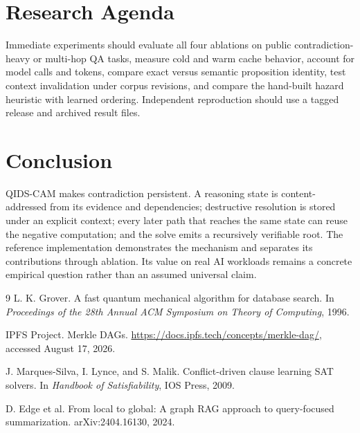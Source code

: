 \documentclass[11pt]{article}
\begin{document}
\section{Research Agenda}
Immediate experiments should evaluate all four ablations on public contradiction-heavy or multi-hop QA tasks, measure cold and warm cache behavior, account for model calls and tokens, compare exact versus semantic proposition identity, test context invalidation under corpus revisions, and compare the hand-built hazard heuristic with learned ordering. Independent reproduction should use a tagged release and archived result files.

\section{Conclusion}
QIDS-CAM makes contradiction persistent. A reasoning state is content-addressed from its evidence and dependencies; destructive resolution is stored under an explicit context; every later path that reaches the same state can reuse the negative computation; and the solve emits a recursively verifiable root. The reference implementation demonstrates the mechanism and separates its contributions through ablation. Its value on real AI workloads remains a concrete empirical question rather than an assumed universal claim.

\begin{thebibliography}{9}
L. K. Grover.
\newblock A fast quantum mechanical algorithm for database search.
\newblock In \emph{Proceedings of the 28th Annual ACM Symposium on Theory of Computing}, 1996.

IPFS Project.
\newblock Merkle DAGs.
\newblock \url{https://docs.ipfs.tech/concepts/merkle-dag/}, accessed August 17, 2026.

J. Marques-Silva, I. Lynce, and S. Malik.
\newblock Conflict-driven clause learning SAT solvers.
\newblock In \emph{Handbook of Satisfiability}, IOS Press, 2009.

D. Edge et al.
\newblock From local to global: A graph RAG approach to query-focused summarization.
\newblock arXiv:2404.16130, 2024.
\end{thebibliography}
\end{document}
